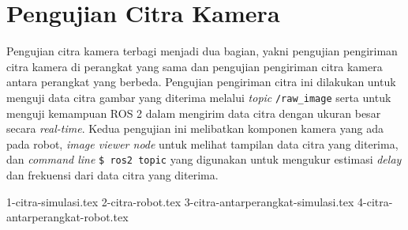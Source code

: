 \section{Pengujian Citra Kamera}
\label{sec:pengujiancitrakamera}

Pengujian citra kamera terbagi menjadi dua bagian,
  yakni pengujian pengiriman citra kamera di perangkat yang sama dan pengujian pengiriman citra kamera antara perangkat yang berbeda.
Pengujian pengiriman citra ini dilakukan untuk menguji data citra gambar yang diterima melalui \emph{topic} \lstinline{/raw_image} serta untuk menguji kemampuan ROS 2 dalam mengirim data citra dengan ukuran besar secara \emph{real-time}.
Kedua pengujian ini melibatkan komponen kamera yang ada pada robot,
  \emph{image viewer node} untuk melihat tampilan data citra yang diterima,
  dan \emph{command line} \lstinline{$ ros2 topic} yang digunakan untuk mengukur estimasi \emph{delay} dan frekuensi dari data citra yang diterima.

{1-citra-simulasi.tex}
{2-citra-robot.tex}
{3-citra-antarperangkat-simulasi.tex}
{4-citra-antarperangkat-robot.tex}
